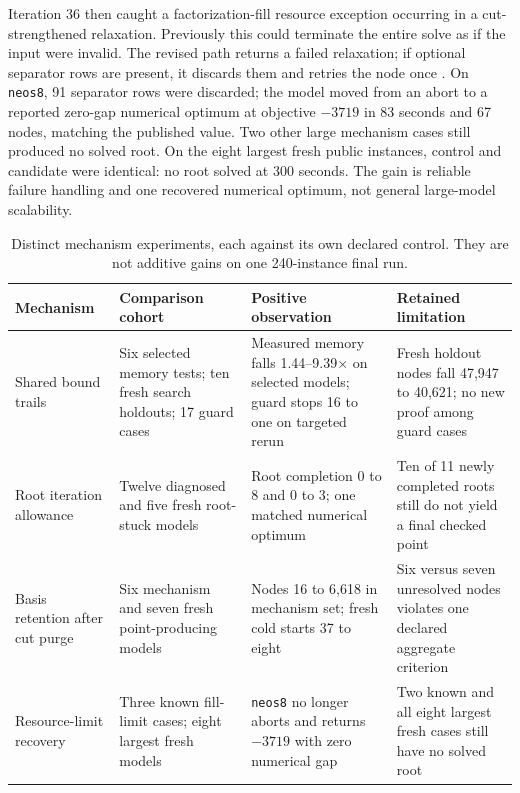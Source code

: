\documentclass[10pt,a4paper,twocolumn]{article}
\begin{document}
Iteration 36 then caught a factorization-fill resource exception occurring in a cut-strengthened relaxation. Previously this could terminate the entire solve as if the input were invalid. The revised path returns a failed relaxation; if optional separator rows are present, it discards them and retries the node once \cite{iter36}. On \texttt{neos8}, 91 separator rows were discarded; the model moved from an abort to a reported zero-gap numerical optimum at objective $-3719$ in 83 seconds and 67 nodes, matching the published value. Two other large mechanism cases still produced no solved root. On the eight largest fresh public instances, control and candidate were identical: no root solved at 300 seconds. The gain is reliable failure handling and one recovered numerical optimum, not general large-model scalability.

\begin{table}[t]
\centering\small
\caption{Distinct mechanism experiments, each against its own declared control. They are not additive gains on one 240-instance final run.}
\label{tab:mechanisms}
\begin{tabularx}{\textwidth}{@{}p{}p{}p{}X@{}}
\toprule
Mechanism & Comparison cohort & Positive observation & Retained limitation\\
\midrule
Shared bound trails \cite{iter33} & Six selected memory tests; ten fresh search holdouts; 17 guard cases & Measured memory falls 1.44--9.39$\times$ on selected models; guard stops 16 to one on targeted rerun & Fresh holdout nodes fall 47,947 to 40,621; no new proof among guard cases\\
Root iteration allowance \cite{iter34} & Twelve diagnosed and five fresh root-stuck models & Root completion 0 to 8 and 0 to 3; one matched numerical optimum & Ten of 11 newly completed roots still do not yield a final checked point\\
Basis retention after cut purge \cite{iter35} & Six mechanism and seven fresh point-producing models & Nodes 16 to 6,618 in mechanism set; fresh cold starts 37 to eight & Six versus seven unresolved nodes violates one declared aggregate criterion\\
Resource-limit recovery \cite{iter36} & Three known fill-limit cases; eight largest fresh models & \texttt{neos8} no longer aborts and returns $-3719$ with zero numerical gap & Two known and all eight largest fresh cases still have no solved root\\
\bottomrule
\end{tabularx}
\end{table}
\end{document}
